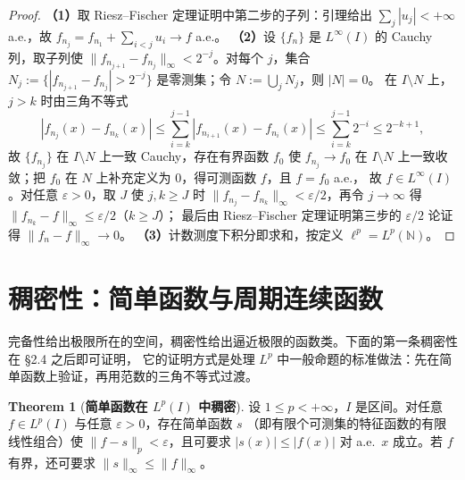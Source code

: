 \documentclass[oneside]{book}
\theoremstyle{definition}
\theoremstyle{definition}
\newtheorem{theorem}{Theorem}[section]
\begin{document}
	\begin{proof}
		\textbf{（1）}取 Riesz--Fischer 定理证明中第二步的子列：引理给出
		$\sum_j|u_j|<+\infty$ a.e.，故 $f_{n_j}=f_{n_1}+\sum_{i<j}u_i\to f$ a.e.。
		\textbf{（2）}设 $\{f_n\}$ 是 $L^\infty(I)$ 的 Cauchy 列，取子列使
		$\|f_{n_{j+1}}-f_{n_j}\|_\infty<2^{-j}$。对每个 $j$，集合
		$N_j:=\{|f_{n_{j+1}}-f_{n_j}|>2^{-j}\}$ 是零测集；令 $N:=\bigcup_jN_j$，则 $|N|=0$。
		在 $I\setminus N$ 上，$j>k$ 时由三角不等式
		\[
		|f_{n_j}(x)-f_{n_k}(x)|\leqslant\sum_{i=k}^{j-1}|f_{n_{i+1}}(x)-f_{n_i}(x)|\leqslant\sum_{i=k}^{j-1}2^{-i}\leqslant2^{-k+1},
		\]
		故 $\{f_{n_j}\}$ 在 $I\setminus N$ 上一致 Cauchy，存在有界函数 $f_0$ 使 $f_{n_j}\to f_0$
		在 $I\setminus N$ 上一致收敛；把 $f_0$ 在 $N$ 上补充定义为 $0$，得可测函数 $f$，且 $f=f_0$ a.e.，
		故 $f\in L^\infty(I)$。对任意 $\varepsilon>0$，取 $J$ 使 $j,k\geqslant J$ 时
		$\|f_{n_j}-f_{n_k}\|_\infty<\varepsilon/2$，再令 $j\to\infty$ 得
		$\|f_{n_k}-f\|_\infty\leqslant\varepsilon/2$（$k\geqslant J$）；
		最后由 Riesz--Fischer 定理证明第三步的 $\varepsilon/2$ 论证得 $\|f_n-f\|_\infty\to0$。
		\textbf{（3）}计数测度下积分即求和，按定义 $\ell^p=L^p(\mathbb N)$。
	\end{proof}
	
	\section{稠密性：简单函数与周期连续函数}
	
	完备性给出极限所在的空间，稠密性给出逼近极限的函数类。下面的第一条稠密性在 §2.4 之后即可证明，
	它的证明方式是处理 $L^p$ 中一般命题的标准做法：先在简单函数上验证，再用范数的三角不等式过渡。
	
	\begin{theorem}[\bfseries{简单函数在 $L^p(I)$ 中稠密}]
		设 $1\leqslant p<+\infty$，$I$ 是区间。对任意 $f\in L^p(I)$ 与任意 $\varepsilon>0$，存在简单函数 $s$
		（即有限个可测集的特征函数的有限线性组合）使 $\|f-s\|_p<\varepsilon$，且可要求
		$|s(x)|\leqslant|f(x)|$ 对 a.e.\ $x$ 成立。若 $f$ 有界，还可要求 $\|s\|_\infty\leqslant\|f\|_\infty$。
	\end{theorem}
	
\end{document}
